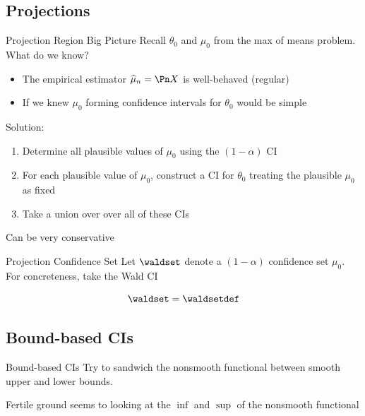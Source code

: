 \documentclass[aspectratio=169, professionalfonts]{beamer}
\begin{document}
\subsection{Projections}
\begin{frame}{Projection Region Big Picture}
	Recall $\theta_0$ and $\mu_0$ from the max of means problem. What do we know?
	\begin{itemize}
		\item The empirical estimator $\widehat{\mu}_n = \Pn X$ is well-behaved
		      (regular)
		      \vfill \pause
		\item If we knew $\mu_0$ forming confidence intervals for ${\theta}_0$
		      would be simple%
	\end{itemize}
	\vfill \pause
	Solution:
	\begin{enumerate}
		\item Determine all plausible values of $\mu_0$ using the $(1- \alpha)$ CI
		\item For each plausible value of $\mu_0$, construct a CI for ${\theta}_0$
		      treating the plausible $\mu_0$ as fixed
		\item Take a union over over all of these CIs
	\end{enumerate}
	\vfill \pause
	Can be very conservative

\end{frame}
\begin{frame}{Projection Confidence Set}
	Let $\waldset$ denote a $(1-\alpha)$ confidence set $\mu_0$. For concreteness, take
	the Wald CI

	$$\waldset = \waldsetdef$$

	\vfill \pause
\end{frame}

\subsection{Bound-based CIs}
\begin{frame}{Bound-based CIs}
	Try to sandwich the nonsmooth functional between smooth upper and lower
	bounds.

	\vfill
	Fertile ground seems to looking at the $\inf$ and $\sup$ of the nonsmooth functional
\end{frame}
\end{document}
